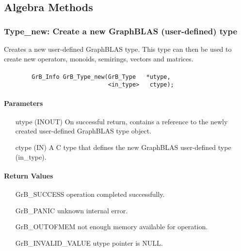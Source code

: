 \subsection{Algebra Methods}
\label{Sec:AlgebraMethods}



\subsubsection{{\sf Type\_new}: Create a new GraphBLAS (user-defined) type}

Creates a new user-defined GraphBLAS type. This type can then be used to create new
operators, monoids, semirings, vectors and matrices.

\paragraph{\syntax}

\begin{verbatim}
        GrB_Info GrB_Type_new(GrB_Type	 *utype,
                              <in_type>	  ctype);
\end{verbatim}

\paragraph{Parameters}

\begin{itemize}[leftmargin=1.1in]
    \item[{\sf utype}] ({\sf INOUT}) On successful return, contains a reference 
                                     to the newly created user-defined GraphBLAS 
                                     type object.
	\item[{\sf ctype}] ({\sf IN})    A C type that defines the new GraphBLAS 
                                     user-defined type ({\sf in\_type}).
\end{itemize}

\paragraph{Return Values}

\begin{itemize}[leftmargin=2.1in]
\item[{\sf GrB\_SUCCESS}]           operation completed successfully.
\item[{\sf GrB\_PANIC}]             unknown internal error.
\item[{\sf GrB\_OUTOFMEM}]          not enough memory available for operation.
\item[{\sf GrB\_INVALID\_VALUE}]    {\sf utype} pointer is {\sf NULL}.
\end{itemize}

